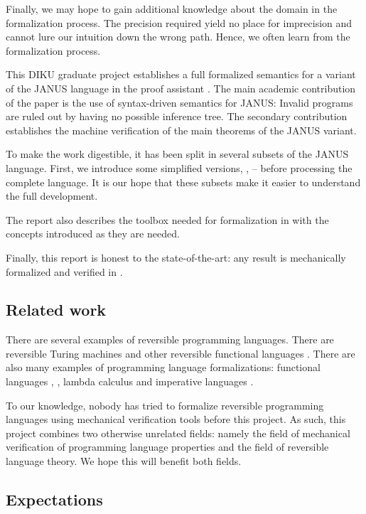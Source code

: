 Finally, we may hope to gain additional knowledge about the domain in
the formalization process. The precision required yield no place for
imprecision and cannot lure our intuition down the wrong path. Hence,
we often learn from the formalization process.

This DIKU graduate project establishes a full formalized semantics for
a variant of the JANUS language in the proof assistant \coq{}. The
main academic contribution of the paper is the use of syntax-driven
semantics for JANUS: Invalid programs are ruled out by having no possible
inference tree. The secondary contribution establishes the machine
verification of the main theorems of the JANUS variant.

To make the work digestible, it has been split in several subsets of
the JANUS language. First, we introduce some simplified versions,
\janusz{}, \januso{} -- before processing the complete language. It is
our hope that these subsets make it easier to understand the full
development.

The report also describes the toolbox needed for formalization in
\coq{} with the concepts introduced as they are needed.

Finally, this report is honest to the state-of-the-art: any result is
mechanically formalized and verified in \coq{}.

\subsection{Related work}

There are several examples of reversible programming languages. There
are reversible Turing machines  and other reversible
functional languages . There are also many examples of
programming language formalizations: functional languages
, , lambda calculus  and
imperative languages .

To our knowledge, nobody has tried to formalize reversible programming
languages using mechanical verification tools before this project. As
such, this project combines two otherwise unrelated fields: namely the
field of mechanical verification of programming language properties
and the field of reversible language theory. We hope this will benefit
both fields.

\subsection{Expectations}

